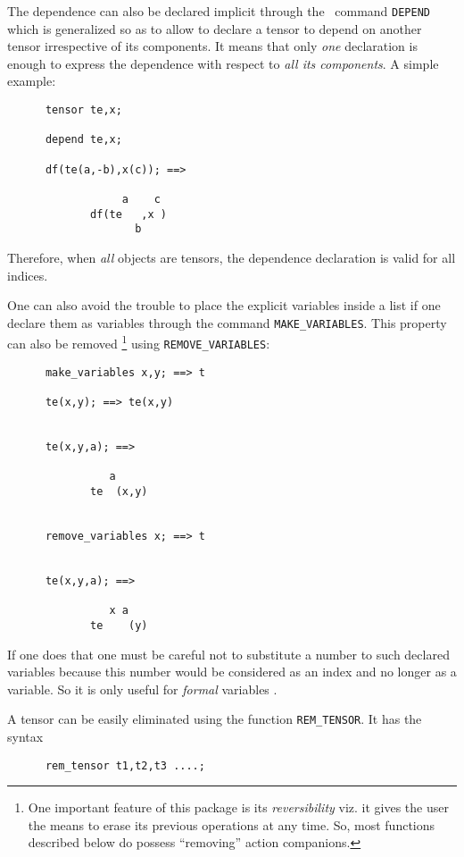 The dependence can also be declared implicit through the \REDUCE\ command
\texttt{DEPEND}
which is generalized so as to allow to declare a tensor
to depend on another tensor irrespective of its components. It means that only \emph{one}
declaration is enough to express the dependence with respect to
\emph{all its components}.
A simple example:
\begin{verbatim}
      tensor te,x;

      depend te,x;

      df(te(a,-b),x(c)); ==>

                  a    c
             df(te   ,x )
                    b
\end{verbatim}
Therefore, when \emph{all} objects are tensors, the dependence declaration
is valid for all indices.

One can also avoid the trouble to place the explicit variables inside a list if
one declare them as variables through the command
\texttt{MAKE\_VARIABLES}.
This property can also be removed%
\footnote{One important feature of this package is its \emph{reversibility}
viz. it gives the user the means to erase its previous operations
at any time. So, most functions described below do
possess ``removing'' action companions.} using
\texttt{REMOVE\_VARIABLES}:
\begin{verbatim}
      make_variables x,y; ==> t

      te(x,y); ==> te(x,y)


      te(x,y,a); ==>

                a
             te  (x,y)


      remove_variables x; ==> t


      te(x,y,a); ==>

                x a
             te    (y)
\end{verbatim}
If one does that one must be careful not to substitute a number to such
declared variables because this number would be considered as an index and
no longer as a variable. So it is only useful for \emph{formal} variables%
.

A tensor can be easily eliminated using the function
\texttt{REM\_TENSOR}. It has the syntax
\begin{verbatim}
      rem_tensor t1,t2,t3 ....;
\end{verbatim}

